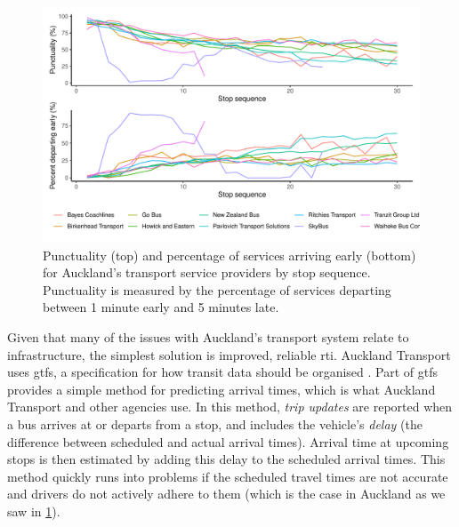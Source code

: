 \begin{knitrout}\small
{}\color{fgcolor}\begin{figure}
\includegraphics[width=\linewidth]{figure/schedule_adhere-1} \caption[Punctuality of Auckland's transport service providers]{Punctuality (top) and percentage of services arriving early (bottom) for Auckland's transport service providers by stop sequence. Punctuality is measured by the percentage of services departing between 1 minute early and 5 minutes late.}\label{fig:schedule_adhere}
\end{figure}


\end{knitrout}



Given that many of the issues with Auckland's transport system relate to infrastructure, the simplest solution is improved, reliable \gls{rti}. Auckland Transport uses \gls{gtfs}, a specification for how transit data should be organised \citep{GoogleDevelopers_2006}. Part of \gls{gtfs} provides a simple method for predicting arrival times, which is what Auckland Transport and other agencies use. In this method, \emph{trip updates} are reported when a bus arrives at or departs from a stop, and includes the vehicle's \emph{delay} (the difference between scheduled and actual arrival times). Arrival time at upcoming stops is then estimated by adding this delay to the scheduled arrival times. This method quickly runs into problems if the scheduled travel times are not accurate and drivers do not actively adhere to them (which is the case in Auckland as we saw in \cref{fig:schedule_adhere}).


